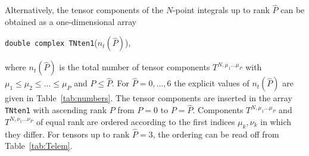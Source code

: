 \documentclass[preprint,sort&compress,12pt]{elsarticle}
\def\refta#1{\mbox{Table~\ref{#1}}}
\begin{document}
Alternatively, the tensor components of the $N$-point integrals up to
rank $\widehat{P}$ can be obtained as a one-dimensional array
\begin{center}
  {\tt double complex TNten1}($n_{t}(\widehat{P})$), 
\end{center}
where $n_{t}(\widehat{P})$ is the total number of tensor components
$T^{N,\mu_1\ldots \mu_P}$
with $\mu_1\le \mu_2\le \ldots\le\mu_P$ and $P\le
\widehat{P}$. For $\widehat{P}=0,\ldots,6$ the explicit values of
$n_{t}(\widehat{P})$ are given in \refta{tab:numbers}. The tensor
components
are inserted in the array {\tt TNten1} with ascending rank $P$ from $P=0$ to $P=\widehat{P}$. 
Components $T^{N,\mu_1\ldots \mu_P}$ and 
${T}^{N,\nu_1\ldots \nu_P}$ of equal rank are ordered 
according to the first indices 
$\mu_k,\nu_k$ in which they differ. For tensors up to rank 
$\widehat{P}=3$, the ordering can be read off from \refta{tab:Telem}.
\end{document}
